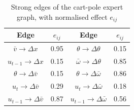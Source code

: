 \documentclass[11pt, a4paper, oneside,enumerate,textcomp]{report}
\newcommand{\vb}{\bar{v}}
\newcommand{\wb}{\bar{\omega}}
\newcommand{\dd}{\Delta}
\begin{document}
\begin{table}[htbp]
\caption{Strong edges of the cart-pole expert graph, with normalised effect $e_{ij}$}
\centering
\small
\begin{tabular}{| c | c || c | c |}
\hline
\textbf{Edge} & $e_{ij}$ & \textbf{Edge} & $e_{ij}$ \\
\hline
$\vb \rightarrow \dd x$ & 0.95 & $\theta \rightarrow \dd\theta$ & 0.15 \\
$u_{t-1} \rightarrow \dd x$ & 0.15 & $\wb \rightarrow \dd\theta$ & 0.85 \\
$\theta \rightarrow \dd\vb$ & 0.15 & $\theta \rightarrow \dd\wb$ & 0.86 \\
$u_t \rightarrow \dd\vb$ & 0.29 & $u_t \rightarrow \dd\wb$ & 0.18 \\
$u_{t-1} \rightarrow \dd\vb$ & 0.87 & $u_{t-1} \rightarrow \dd\wb$ & 0.56 \\
\hline
\end{tabular}
\label{tab:cp_expert}
\end{table}
\end{document}
